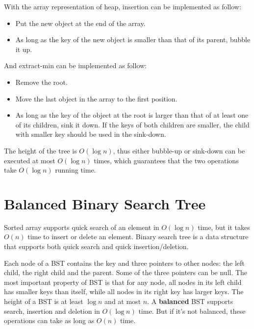 With the array representation of heap, insertion can be implemented as follow:
\begin{itemize}
\item Put the new object at the end of the array.
\item As long as the key of the new object is smaller than that of its parent, bubble it up.
\end{itemize}
And extract-min can be implemented as follow:
\begin{itemize}
\item Remove the root.
\item Move the last object in the array to the first position.
\item As long as the key of the object at the root is larger than that of at least one of its children, sink it down. If the keys of both children are smaller, the child with smaller key should be used in the sink-down.
\end{itemize}
The height of the tree is $O(\log n)$, thus either bubble-up or sink-down can be executed at most $O(\log n)$ times, which guarantees that the two operations take $O(\log n)$ running time.
\section{Balanced Binary Search Tree}
Sorted array supports quick search of an element in $O(\log n)$ time, but it takes $O(n)$ time to insert or delete an element. Binary search tree is a data structure that supports both quick search and quick insertion/deletion. 

Each node of a BST contains the key and three pointers to other nodes: the left child, the right child and the parent. Some of the three pointers can be null. The most important property of BST is that for any node, all nodes in its left child has smaller keys than itself, while all nodes in its right key has larger keys. The height of a BST is at least $\log n$ and at most $n$. A \textbf{balanced} BST supports search, insertion and deletion in $O(\log n)$ time. But if it's not balanced, these operations can take as long as $O(n)$ time.

